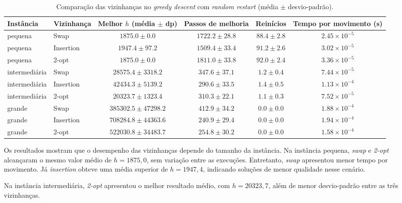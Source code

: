 \begin{table}[!t]
	\centering
	\caption{Comparação das vizinhanças no \textit{greedy descent} com
		\textit{random restart} (média $\pm$ desvio-padrão).}
	\label{tab:t2}
	\small
	\begin{tabular}{llcccc}
		\toprule
		Instância & Vizinhança & Melhor $h$ (média $\pm$ dp) &
		Passos de melhoria & Reinícios & Tempo por movimento (s)\\
		\midrule
		pequena & Swap
		& $1875.0 \pm 0.0$ & $1722.2 \pm 28.8$
		& $88.4 \pm 2.8$ & $2.45 \times 10^{-5}$\\
		pequena & Insertion
		& $1947.4 \pm 97.2$ & $1509.4 \pm 33.4$
		& $91.2 \pm 2.6$ & $3.02 \times 10^{-5}$\\
		pequena & 2-opt
		& $1875.0 \pm 0.0$ & $1811.0 \pm 33.8$
		& $92.0 \pm 2.4$ & $3.36 \times 10^{-5}$\\
		\midrule
		intermediária & Swap
		& $28575.4 \pm 3318.2$ & $347.6 \pm 37.1$
		& $1.2 \pm 0.4$ & $7.44 \times 10^{-5}$\\
		intermediária & Insertion
		& $42434.3 \pm 5139.2$ & $290.6 \pm 33.5$
		& $1.4 \pm 0.5$ & $1.13 \times 10^{-4}$\\
		intermediária & 2-opt
		& $20323.7 \pm 1323.4$ & $310.3 \pm 22.1$
		& $1.1 \pm 0.3$ & $7.52 \times 10^{-5}$\\
		\midrule
		grande & Swap
		& $385302.5 \pm 47298.2$ & $412.9 \pm 34.2$
		& $0.0 \pm 0.0$ & $1.88 \times 10^{-4}$\\
		grande & Insertion
		& $708284.8 \pm 44363.6$ & $240.9 \pm 29.4$
		& $0.0 \pm 0.0$ & $1.94 \times 10^{-4}$\\
		grande & 2-opt
		& $522030.8 \pm 34483.7$ & $254.8 \pm 30.2$
		& $0.0 \pm 0.0$ & $1.58 \times 10^{-4}$\\
		\bottomrule
	\end{tabular}
\end{table}

Os resultados mostram que o desempenho das vizinhanças depende do tamanho da instância. Na instância pequena, \textit{swap} e \textit{2-opt} alcançaram o mesmo valor médio de \(h=1875,0\), sem variação entre as execuções. Entretanto, \textit{swap} apresentou menor tempo por movimento. Já \textit{insertion} obteve uma média superior de \(h=1947,4\), indicando soluções de menor qualidade nesse cenário.

Na instância intermediária, \textit{2-opt} apresentou o melhor resultado médio, com \(h=20323,7\), além de menor desvio-padrão entre as três vizinhanças. 

